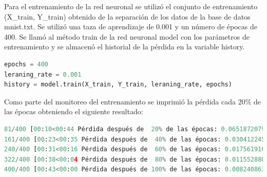 \documentclass{article}
\begin{document}
    Para el entrenamiento de la red neuronal se utilizó el conjunto de entrenamiento (X\_train, Y\_train)
    obtenido de la separación de los datos de la base de datos mnist.txt.
    Se utilizó una taza de aprendizaje de 0.001 y un número de épocas de 400.
    Se llamó al método train de la red neuronal model con los parámetros de entrenamiento y se almacenó el historial de la pérdida en la variable history.
    \begin{lstlisting}[language=Python, caption={Entrenamiento de la red neuronal}, label={lst:entrenamiento_red_neuronal}]
epochs = 400
leraning_rate = 0.001
history = model.train(X_train, Y_train, leraning_rate, epochs)
    \end{lstlisting}
    Como parte del monitoreo del entrenamiento se imprimió la pérdida cada 20\% de las épocas obteniendo el siguiente resultado:
    \begin{lstlisting}[language=Python, caption={Pérdida durante el entrenamiento}, label={lst:perdida_entrenamiento}]
 81/400 [00:10<00:44 Pérdida después de  20% de las épocas: 0.0651872079107243
161/400 [00:23<00:35 Pérdida después de  40% de las épocas: 0.0304122451910206
240/400 [00:31<00:16 Pérdida después de  60% de las épocas: 0.0175619166603654
322/400 [00:38<00:04 Pérdida después de  80% de las épocas: 0.0115528805206416
400/400 [00:43<00:00 Pérdida después de 100% de las épocas: 0.0082408631950890
    \end{lstlisting}
\clearpage
\end{document}
